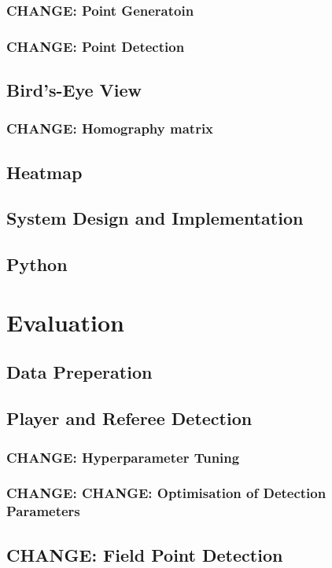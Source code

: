 \documentclass[12pt, letterpaper]{article}
\begin{document}
\subsubsection{\textbf{CHANGE}: Point Generatoin}
\subsubsection{\textbf{CHANGE}: Point Detection}
\subsection{Bird’s-Eye View}
\subsubsection{\textbf{CHANGE}: Homography matrix}
\subsection{Heatmap}
\subsection{System Design and Implementation}
\subsection{Python}
\newpage

\section{Evaluation}

\subsection{Data Preperation}
\subsection{Player and Referee Detection}
\subsubsection{\textbf{CHANGE}: Hyperparameter Tuning}
\subsubsection{\textbf{CHANGE}: \textbf{CHANGE}: Optimisation of Detection Parameters}
\subsection{\textbf{CHANGE}: Field Point Detection}
\end{document}
